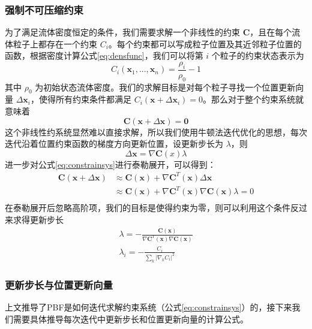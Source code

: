 \subsubsection{强制不可压缩约束}
    为了满足流体密度恒定的条件，我们需要求解一个非线性的约束 $\mathbf C$，且在每个流体粒子上都存在一个约束 $C_i$。每个约束都可以写成粒子位置及其近邻粒子位置的函数，根据密度计算公式\ref{eq:densfunc}，我们可以将第 $i$ 个粒子的约束状态表示为
    \begin{equation}
    	C_i(\mathbf{x}_1,...,\mathbf{x}_n)  = \frac {\rho_i} {\rho_0} - 1
    \end{equation}
    其中 $\rho_0$ 为初始状态流体密度。我们的求解目标是对每个粒子寻找一个位置更新向量 $\Delta \mathbf x_i$，使得所有约束条件都满足 $C_i(\mathbf x + \Delta \mathbf x_i) = 0$。那么对于整个约束系统就意味着
    \begin{equation}\label{eq:constrainsys}
    	\mathbf C(\mathbf x + \Delta \mathbf x) = \mathbf 0
    \end{equation}
    这个非线性约系统显然难以直接求解，所以我们使用牛顿法迭代优化的思想，每次迭代沿着位置约束函数的梯度方向更新位置，设更新步长为 $\lambda$，则
    \begin{equation}
    	\Delta \mathbf x = \nabla \mathbf C(x) \lambda
    \end{equation}
    进一步对公式\ref{eq:constrainsys}进行泰勒展开，可以得到：
    \begin{equation}
    	\begin{aligned}
    	\mathbf C(\mathbf x + \Delta \mathbf x) 
    	& \approx \mathbf C (\mathbf x) + \nabla \mathbf C^T(\mathbf x) \Delta \mathbf x \\
    	& \approx \mathbf C (\mathbf x) + \nabla \mathbf C^T(\mathbf x) \nabla \mathbf C(\mathbf x) \lambda = 0 \\
    	\end{aligned}
    \end{equation}
    在泰勒展开后忽略高阶项，我们的目标是使得约束为零，则可以利用这个条件反过来求得更新步长
    \begin{equation}\label{eq:lambda1}
    	\begin{gathered}
    	\lambda = - \frac {\mathbf C (\mathbf x)} {\nabla \mathbf C^T(\mathbf x) \nabla \mathbf C(\mathbf x)} \\
    	\lambda_i = - \frac {C_i} {\sum_k |\nabla_k C_i|^2}
    	\end{gathered}
    \end{equation}


\subsubsection{更新步长与位置更新向量}
    上文推导了PBF是如何迭代求解约束系统（公式\ref{eq:constrainsys}）的，接下来我们需要具体推导每次迭代中更新步长和位置更新向量的计算公式。


